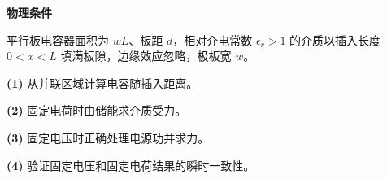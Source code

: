 \textbf{物理条件}\par 平行板电容器面积为 \(wL\)、板距 \(d\)，相对介电常数 \(\epsilon_r>1\) 的介质以插入长度 \(0<x<L\) 填满板隙，边缘效应忽略，极板宽 \(w\)。
\par\noindent\textbf{(1)} 从并联区域计算电容随插入距离。
\par\noindent\textbf{(2)} 固定电荷时由储能求介质受力。
\par\noindent\textbf{(3)} 固定电压时正确处理电源功并求力。
\par\noindent\textbf{(4)} 验证固定电压和固定电荷结果的瞬时一致性。
